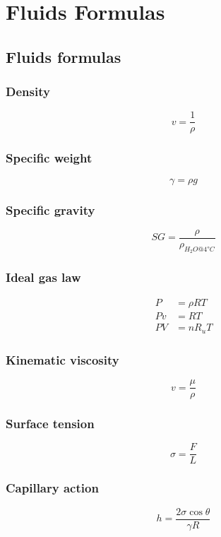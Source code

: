 \chapter{Fluids Formulas}
\section{Fluids formulas}
\subsection{Density}
\begin{equation*}
  v = \frac{1}{\rho}
\end{equation*}
\subsection{Specific weight}
\begin{equation*}
  \gamma = \rho g
\end{equation*}
\subsection{Specific gravity}
\begin{equation*}
  SG = \frac{\rho}{\rho_{H_2O @ 4\si{\degree}C}}
\end{equation*}
\subsection{Ideal gas law}
\begin{align*}
  P  & = \rho R T \\
  Pv & = RT       \\
  PV & = n R_u T
\end{align*}
\subsection{Kinematic viscosity}
\begin{equation*}
  v = \frac{\mu}{\rho}
\end{equation*}
\subsection{Surface tension}
\begin{equation*}
  \sigma = \frac{F}{L}
\end{equation*}
\subsection{Capillary action}
\begin{equation*}
  h = \frac{2 \sigma \cos \theta}{\gamma R}
\end{equation*}
